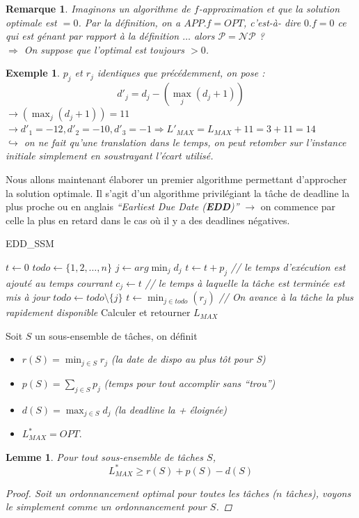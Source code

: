 \documentclass{article}
\newtheorem{exemple}{Exemple}[section]
\newtheorem{rem}{Remarque}[section]
\newtheorem{lemme}{Lemme}[section]
\newtheorem{proof}{Preuve}[section]
\begin{document}
\begin{sffamily}
\begin{rem}
Imaginons un algorithme de $f$-\textit{approximation} et que la solution optimale est $=0$. Par la définition, on a $APP.f=OPT$, c'est-à-
dire $0.f = 0$ ce qui est génant par rapport à la définition $\ldots$ alors $\mathcal{P} = \mathcal{NP}$ ? \\
$\Rightarrow$ On suppose que l'optimal est toujours $> 0$.
\end{rem}

\begin{exemple}
$p_j$ et $r_j$ identiques que précédemment, on pose :
		  $$d'_j = d_j - (\max_j (d_j + 1))$$
$\rightarrow (\max_j (d_j + 1)) = 11$\\
$\rightarrow d'_1 = -12, d'_2 = -10, d'_3 = -1 \Rightarrow L'_{MAX} = L_{MAX} + 11 = 3+11 = 14$ \\
$\hookrightarrow$ on ne fait qu'une translation dans le temps, on peut retomber sur l'instance initiale simplement en soustrayant l'écart 
utilisé.
\end{exemple}

Nous allons maintenant élaborer un premier algorithme permettant d'approcher la solution optimale. Il s'agit d'un algorithme privilégiant 
la tâche de deadline la plus proche ou en anglais \textit{``Earliest Due Date (\textbf{EDD})''} $\rightarrow$ on commence par celle la 
plus en retard dans le cas où il y a des deadlines négatives.

\begin{algorithm}[h!]
\caption{EDD\_SSM}
\begin{algorithmic}[1]
\STATE $t\leftarrow 0$
\STATE $todo \leftarrow \{1,2,\ldots,n\}$
\STATE $j\leftarrow arg\min_j{d_j}$
\STATE $t\leftarrow t+p_j$ \textit{// le temps d'exécution est ajouté au temps courrant}
\STATE $c_j \leftarrow t$ \textit{// le temps à laquelle la tâche est terminée est mis à jour}
\STATE $todo \leftarrow todo \setminus \{j\}$
\ELSE
\STATE $t\leftarrow \min_{j\in todo}(r_j)$ \textit{// On avance à la tâche la plus rapidement disponible}
\ENDIF
\ENDWHILE
\STATE Calculer et retourner $L_{MAX}$
\end{algorithmic}
\end{algorithm}

Soit $S$ un sous-ensemble de tâches, on définit
\begin{itemize}
\item $r(S) = \min_{j\in S} r_j$ \textit{(la date de dispo au plus tôt pour S)}
\item $p(S) = \sum_{j\in S} p_j$ \textit{(temps pour tout accomplir sans ``trou'')}
\item $d(S) = \max_{j\in S} d_j$ \textit{(la deadline la + éloignée)}
\item $L^*_{MAX} = OPT$.
\end{itemize}
\newpage
\begin{lemme} Pour tout sous-ensemble de tâches $S$, 
$$ L^*_{MAX} \geq r(S) + p(S) - d(S) $$
\begin{proof}
Soit un ordonnancement optimal pour toutes les tâches ($n$ tâches), voyons le simplement comme un ordonnancement pour $S$.


\end{proof}
\end{lemme}
\end{sffamily}
\end{document}
